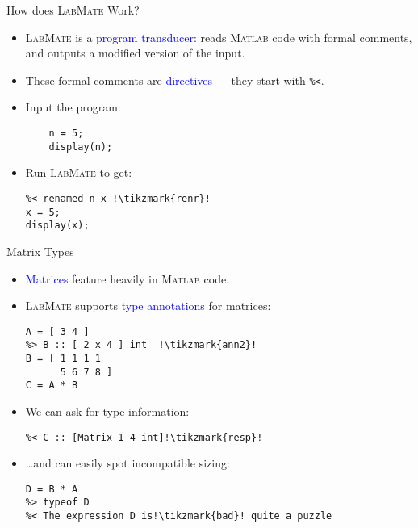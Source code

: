 \documentclass[]{beamer}
\newcommand{\tikzmark}[1]{\tikz[overlay,remember picture,baseline=-0.5ex] \node (#1) {};}
\newcommand{\keyword}[1]{\textcolor{blue}{#1}}
\newcommand{\lm}{\textsc{LabMate}\xspace}
\newcommand{\ma}{\textsc{Matlab}\xspace}
\begin{document}

\begin{frame}[fragile]{How does \lm Work?}
  \begin{itemize}[<+->]
  \item \lm is a \keyword{program transducer}: reads \ma code with formal comments, and outputs a modified version of the input.
    \medskip
  \item These formal comments are \keyword{directives} --- they start with \textcolor{commentgreen}{\texttt{\%<}}.
    \medskip
  \item Input the program:
   \begin{lstlisting}[xleftmargin=2em]
    %> rename n x !\tikzmark{ren}!
    n = 5;
    display(n);
   \end{lstlisting}
  \item Run \lm to get:
   \begin{lstlisting}[xleftmargin=2em]
%< LabMate 0.2.0.1 !\tikzmark{ver}!
%< renamed n x !\tikzmark{renr}!
x = 5;
display(x);
   \end{lstlisting}
\end{itemize}
\end{frame}

\begin{frame}[fragile]{Matrix Types}
  \begin{itemize}[<+->]
  \item \keyword{Matrices} feature heavily in \ma code.
    \medskip
  \item \lm supports \keyword{type annotations} for matrices:
    \begin{lstlisting}[xleftmargin=0em, belowskip=-0.5em]
%> A :: [ 1 x 2 ] int  !\tikzmark{ann1}!
A = [ 3 4 ]
%> B :: [ 2 x 4 ] int  !\tikzmark{ann2}!
B = [ 1 1 1 1
      5 6 7 8 ]
C = A * B
    \end{lstlisting}
  \item We can ask for type information:
    \begin{lstlisting}[xleftmargin=0em, belowskip=-0.5em]
%> typeof C !\tikzmark{query}!
%< C :: [Matrix 1 4 int]!\tikzmark{resp}!
    \end{lstlisting}
  \item \ldots and can easily spot incompatible sizing:
    \begin{lstlisting}[xleftmargin=0em]
D = B * A
%> typeof D
%< The expression D is!\tikzmark{bad}! quite a puzzle
    \end{lstlisting}
\end{itemize}
\end{frame}
\end{document}
